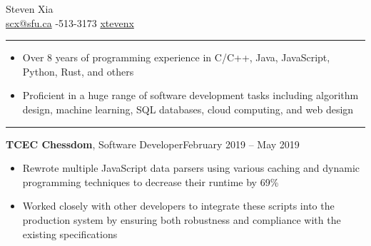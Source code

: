 \documentclass{article}
\newcommand{\entrytitle}[3]{\vspace{0.5em}\textbf{#1}, {\small #2}\hfill #3}
\renewcommand{\section}[1]{\vspace{1em}{\Large #1}\vspace{0.3em}\hrule}
\newenvironment{entrybody}{\begin{itemize}[itemsep=0.3em]}{\end{itemize}}
\begin{document}
\selectfont
\pagestyle{empty}


\begin{center}
    {\huge Steven Xia} \\\vspace{1em}
    \faEnvelope\: \href{mailto:scx@sfu.ca}{scx@sfu.ca} \qquad
    \faPhoneSquare*{}-513-3173 \qquad
    \faGithub\: \href{https://github.com/xtevenx}{xtevenx}
\end{center}\vspace{-1em}


\section{Skills} \vspace{0.5em}

\begin{entrybody}
\item Over 8 years of programming experience in C/C++, Java, JavaScript, Python, Rust, and others
\item
    Proficient in a huge range of software development tasks including
    algorithm design,
    machine learning,
    SQL databases,
    cloud computing,
    and
    web design
\end{entrybody}


\section{Experience}


\entrytitle{TCEC Chessdom}{Software Developer}{February 2019 – May 2019}
\begin{entrybody}
\item
    Rewrote multiple JavaScript data parsers using various caching and dynamic programming
    techniques to decrease their runtime by 69\%
\item
    Worked closely with other developers to integrate these scripts into the production system by
    ensuring both robustness and compliance with the existing specifications
\end{entrybody}
\end{document}
